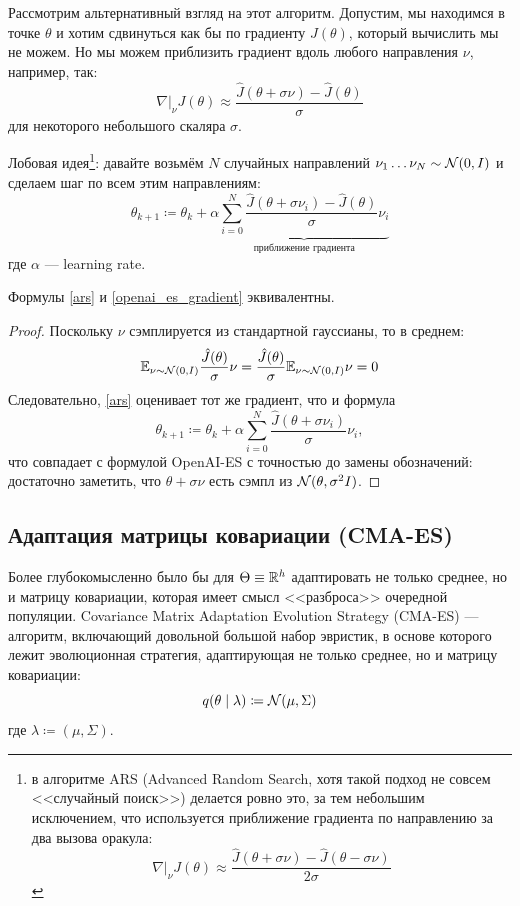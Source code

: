 Рассмотрим альтернативный взгляд на этот алгоритм. Допустим, мы находимся в точке $\theta$ и хотим сдвинуться как бы по градиенту $J(\theta)$, который вычислить мы не можем. Но мы можем приблизить градиент вдоль любого направления $\nu$, например, так:
$$ \left. \nabla \right|_{\nu} J(\theta) \approx \frac{\hat{J}(\theta + \sigma \nu) - \hat{J}(\theta)}{\sigma}$$
для некоторого небольшого скаляра $\sigma$.

Лобовая идея\footnote{в алгоритме ARS (Advanced Random Search, хотя такой подход не совсем <<случайный поиск>>) делается ровно это, за тем небольшим исключением, что используется приближение градиента по направлению за два вызова оракула:
$$ \left. \nabla \right|_{\nu} J(\theta) \approx \frac{\hat{J}(\theta + \sigma \nu) - \hat{J}(\theta - \sigma \nu)}{2\sigma}$$}: давайте возьмём $N$ случайных направлений $\nu_1 \dots \nu_N \sim \mathcal{N}(0, I)$ и сделаем шаг по всем этим направлениям:
\begin{equation}\label{ars}
\theta_{k+1} \coloneqq \theta_k + \alpha \underbrace{\sum_{i=0}^N \frac{\hat{J}(\theta + \sigma \nu_i) - \hat{J}(\theta)}{\sigma}\nu_i}_{\text{приближение градиента}}
\end{equation}
где $\alpha$ --- learning rate.

\begin{proposition}
Формулы \eqref{ars} и \eqref{openai_es_gradient} эквивалентны.
\begin{proof}
Поскольку $\nu$ сэмплируется из стандартной гауссианы, то в среднем:
$$\mathbb{E}_{\nu \sim \mathcal{N}(0, I)} \frac{\hat{J}(\theta)}{\sigma} \nu = \frac{\hat{J}(\theta)}{\sigma} \mathbb{E}_{\nu \sim \mathcal{N}(0, I)} \nu = 0$$
Следовательно, \eqref{ars} оценивает тот же градиент, что и формула
$$\theta_{k+1} \coloneqq \theta_k + \alpha \sum_{i=0}^N \frac{\hat{J}(\theta + \sigma \nu_i)}{\sigma}\nu_i,$$
что совпадает с формулой OpenAI-ES с точностью до замены обозначений: достаточно заметить, что $\theta + \sigma \nu$ есть сэмпл из $\mathcal{N}(\theta, \sigma^2 I)$.
\end{proof}
\end{proposition}

\subsection{Адаптация матрицы ковариации (CMA-ES)}

Более глубокомысленно было бы для $\Theta \equiv \mathbb{R}^{h}$ адаптировать не только среднее, но и матрицу ковариации, которая имеет смысл <<разброса>> очередной популяции. Covariance Matrix Adaptation Evolution Strategy (CMA-ES) --- алгоритм, включающий довольной большой набор эвристик, в основе которого лежит эволюционная стратегия, адаптирующая не только среднее, но и матрицу ковариации:
\begin{equation}\label{covadapt}
q(\theta \mid \lambda) \coloneqq \mathcal{N}(\mu, \Sigma)
\end{equation}
где $\lambda \coloneqq (\mu, \Sigma)$.

